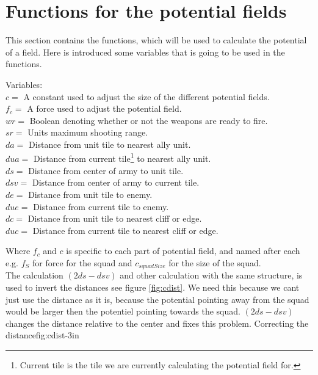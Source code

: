 \section{Functions for the potential fields}
	This section contains the functions, which will be used to calculate the potential of a field. Here is introduced some variables that 
	is going to be used in the functions.
	
	\label{cha3_variables}
	Variables:\\
	$c =$ A constant used to adjust the size of the different potential fields.\\ 
	$f_c =$ A force used to adjust the potential field.\\
	$wr =$ Boolean denoting whether or not the weapons are ready to fire.\\
	$sr =$ Units maximum shooting range.\\
	$da =$ Distance from unit tile to nearest ally unit.\\
	$dua =$ Distance from current tile\footnote{Current tile is the tile we are currently calculating the potential field for.} to nearest ally unit.\\
	$ds =$ Distance from center of army to unit tile.\\
	$dsv =$ Distance from center of army to current tile.\\
	$de =$ Distance from unit tile to enemy.\\
	$due =$ Distance from current tile to enemy.\\
	$dc =$ Distance from unit tile to nearest cliff or edge. \\
	$duc =$ Distance from current tile to nearest cliff or edge. 
	
	
	
	Where $f_c$ and $c$ is specific to each part of potential field, and named after each e.g. $f_{S}$ for force for the squad and $c_{squadSize}$ for the size of the squad.\\
	
	The calculation $(2ds - dsv)$ and other calculation with the same structure, is used to invert the distances see figure \ref{fig:cdist}. We need this because we cant just use the distance as it is, because the potential pointing away from the squad would be larger then the potentiel pointing towards the squad. $(2ds - dsv)$ changes the distance relative to the center and fixes this problem.    
		    {Correcting the distance}{fig:cdist}{-3in}

